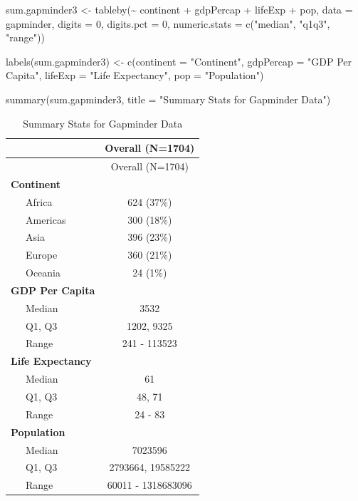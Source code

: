 \documentclass[
]{book}
\makeatletter
\newenvironment{Shaded}{\begin{snugshade}}{\end{snugshade}}
\newcommand{\AttributeTok}[1]{\textcolor[rgb]{0.61,0.61,0.61}{#1}}
\newcommand{\DecValTok}[1]{\textcolor[rgb]{0.06,0.06,0.06}{#1}}
\newcommand{\FunctionTok}[1]{\textcolor[rgb]{0,0,0}{#1}}
\newcommand{\NormalTok}[1]{#1}
\newcommand{\OtherTok}[1]{\textcolor[rgb]{0.37,0.37,0.37}{#1}}
\newcommand{\SpecialCharTok}[1]{\textcolor[rgb]{0,0,0}{#1}}
\newcommand{\StringTok}[1]{\textcolor[rgb]{0.5,0.5,0.5}{#1}}
\newenvironment{kframe}{%
\medskip{}
\setlength{\fboxsep}{.8em}
 \def\at@end@of@kframe{}%
 \ifinner\ifhmode%
  \def\at@end@of@kframe{\end{minipage}}%
  \begin{minipage}{\columnwidth}%
 \fi\fi%
 \def\FrameCommand##1{\hskip\@totalleftmargin \hskip-\fboxsep
 \colorbox{shadecolor}{##1}\hskip-\fboxsep
     \hskip-\linewidth \hskip-\@totalleftmargin \hskip\columnwidth}%
 \MakeFramed {\advance\hsize-\width
   \@totalleftmargin\z@ \linewidth\hsize
   \@setminipage}}%
 {\par\unskip\endMakeFramed%
 \at@end@of@kframe}
\renewenvironment{Shaded}{\begin{kframe}}{\end{kframe}}
\makeatother
\begin{document}
\begin{Shaded}
\begin{Highlighting}[]
\NormalTok{sum.gapminder3 }\OtherTok{\textless{}{-}} \FunctionTok{tableby}\NormalTok{(}\SpecialCharTok{\textasciitilde{}}\NormalTok{ continent }\SpecialCharTok{+}\NormalTok{ gdpPercap }\SpecialCharTok{+}\NormalTok{ lifeExp }\SpecialCharTok{+}\NormalTok{ pop, }\AttributeTok{data =}\NormalTok{ gapminder, }\AttributeTok{digits =} \DecValTok{0}\NormalTok{, }\AttributeTok{digits.pct =} \DecValTok{0}\NormalTok{, }\AttributeTok{numeric.stats =} \FunctionTok{c}\NormalTok{(}\StringTok{"median"}\NormalTok{, }\StringTok{"q1q3"}\NormalTok{, }\StringTok{"range"}\NormalTok{))}

\FunctionTok{labels}\NormalTok{(sum.gapminder3) }\OtherTok{\textless{}{-}} \FunctionTok{c}\NormalTok{(}\AttributeTok{continent =} \StringTok{"Continent"}\NormalTok{, }\AttributeTok{gdpPercap =} \StringTok{"GDP Per Capita"}\NormalTok{, }\AttributeTok{lifeExp =} \StringTok{"Life Expectancy"}\NormalTok{, }\AttributeTok{pop =} \StringTok{"Population"}\NormalTok{)}
\end{Highlighting}
\end{Shaded}

\begin{Shaded}
\begin{Highlighting}[]
\FunctionTok{summary}\NormalTok{(sum.gapminder3, }\AttributeTok{title =} \StringTok{"Summary Stats for Gapminder Data"}\NormalTok{)}
\end{Highlighting}
\end{Shaded}

\begin{longtable}[]{@{}lc@{}}
\caption{Summary Stats for Gapminder Data}\tabularnewline
\toprule
& Overall (N=1704) \\
\midrule
\endfirsthead
\toprule
& Overall (N=1704) \\
\midrule
\endhead
\textbf{Continent} & \\
~~~Africa & 624 (37\%) \\
~~~Americas & 300 (18\%) \\
~~~Asia & 396 (23\%) \\
~~~Europe & 360 (21\%) \\
~~~Oceania & 24 (1\%) \\
\textbf{GDP Per Capita} & \\
~~~Median & 3532 \\
~~~Q1, Q3 & 1202, 9325 \\
~~~Range & 241 - 113523 \\
\textbf{Life Expectancy} & \\
~~~Median & 61 \\
~~~Q1, Q3 & 48, 71 \\
~~~Range & 24 - 83 \\
\textbf{Population} & \\
~~~Median & 7023596 \\
~~~Q1, Q3 & 2793664, 19585222 \\
~~~Range & 60011 - 1318683096 \\
\bottomrule
\end{longtable}
\end{document}
